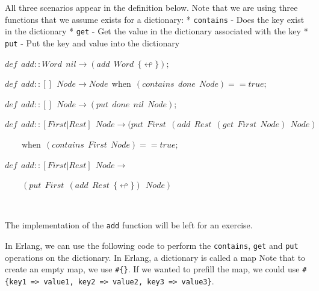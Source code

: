 \documentclass[
]{book}
\begin{document}
All three scenarios appear in the definition below. Note that we are using three functions that we assume exists for a dictionary:
* \texttt{contains} - Does the key exist in the dictionary
* \texttt{get} - Get the value in the dictionary associated with the key
* \texttt{put} - Put the key and value into the dictionary

\begin{formulabox}
\(de\mathit{f} ~ ~ add :: Word ~ ~ nil \rightarrow (add ~ ~ Word ~ ~ \lbrace \looparrowleft \rbrace);\)

\(de\mathit{f} ~ ~ add :: [] ~ ~ Node \rightarrow Node ~ ~ \text{when} ~ ~ (contains ~ ~ done ~ ~ Node) == true;\)

\(de\mathit{f} ~ ~ add :: [] ~ ~ Node \rightarrow (put ~ ~ done ~ ~ nil ~ ~ Node);\)

\(de\mathit{f} ~ ~ add :: [First|Rest] ~ ~ Node \rightarrow(put ~ ~ First ~ ~ (add ~ ~ Rest ~ ~ (get ~ ~First ~ ~ Node) ~ ~ Node) ~ ~\)

\(\quad \quad \text{when} ~ ~ (contains ~ ~ First ~ ~ Node) == true;\)

\(de\mathit{f} ~ ~ add :: [First|Rest] ~ ~ Node \rightarrow\)

\(\quad \quad (put ~ ~ First ~ ~ (add ~ ~ Rest ~ ~ \lbrace \looparrowleft \rbrace) ~ ~ Node)\)

\end{formulabox}

\(\nonumber\)

The implementation of the \texttt{add} function will be left for an exercise.

In Erlang, we can use the following code to perform the \texttt{contains}, \texttt{get} and \texttt{put} operations on the dictionary. In Erlang, a dictionary is called a map Note that to create an empty map, we use \texttt{\#\{\}}. If we wanted to prefill the map, we could use \texttt{\#\{key1\ =\textgreater{}\ value1,\ key2\ =\textgreater{}\ value2,\ key3\ =\textgreater{}\ value3\}}.
\end{document}
